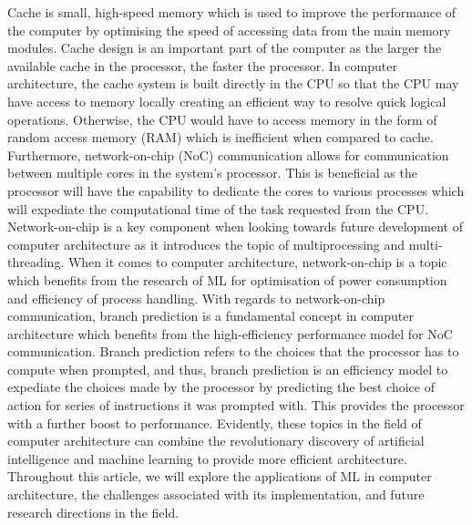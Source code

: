 \documentclass[conference]{IEEEtran}
\begin{document}
Cache is small, high-speed memory which is used to improve the performance of the computer by optimising the speed of accessing 
data from the main memory modules. Cache design is an important part of the computer as the larger the available cache in the processor, 
the faster the processor. In computer architecture, the cache system is built directly in the CPU so that the CPU may have access to memory 
locally creating an efficient way to resolve quick logical operations. Otherwise, the CPU would have to access memory in the form of 
random access memory (RAM) which is inefficient when compared to cache. Furthermore, network-on-chip (NoC) communication allows for 
communication between multiple cores in the system's processor. This is beneficial as the processor will have the capability to 
dedicate the cores to various processes which will expediate the computational time of the task requested from the CPU. 
Network-on-chip is a key component when looking towards future development of computer architecture as it introduces the topic of 
multiprocessing and multi-threading. When it comes to computer architecture, network-on-chip is a topic which benefits from the research of 
ML for optimisation of power consumption and efficiency of process handling. With regards to network-on-chip communication, branch prediction 
is a fundamental concept in computer architecture which benefits from the high-efficiency performance model for NoC communication. Branch prediction 
refers to the choices that the processor has to compute when prompted, and thus, branch prediction is an efficiency model to expediate the 
choices made by the processor by predicting the best choice of action for series of instructions it was prompted with. This provides the processor with a further boost to performance. 
Evidently, these topics in the field of computer architecture can combine the revolutionary discovery of artificial intelligence and machine learning 
to provide more efficient architecture. Throughout this article, we will explore the applications of ML in computer architecture, the challenges 
associated with its implementation, and future research directions in the field.
\end{document}
